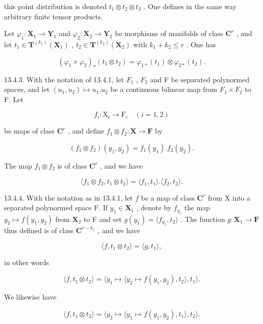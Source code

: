 this point distribution is denoted \(t_{1} \otimes t_{2} \otimes t_{3}\) . One defines in the same way arbitrary finite tensor products.

Let \(\varphi_{1}\colon\mathbf{X}_{1}\to\mathbf{Y}_{1}\) and \(\varphi_{2}\colon\mathbf{X}_{2}\to\mathbf{Y}_{2}\) be morphisms of manifolds of class \(\mathbf{C}^{r}\) , and let \(t_{1}\in\mathbf{T}^{(k_{1})}(\mathbf{X}_{1})\) , \(t_{2}\in\mathbf{T}^{(k_{2})}(\mathbf{X}_{2})\) with \(k_{1}+k_{2}\leqslant r\) . One has

\[
(\varphi_ {1} \times \varphi_ {2}) _ {*} (t _ {1} \otimes t _ {2}) = \varphi_ {1 *} (t _ {1}) \otimes \varphi_ {2 *} (t _ {2}).
\]

13.4.3. With the notation of 13.4.1, let \(F_{1}\) , \(F_{2}\) and F be separated polynormed spaces, and let \((u_{1}, u_{2}) \mapsto u_{1}.u_{2}\) be a continuous bilinear map from \(F_{1} \times F_{2}\) to F. Let

\[
f _ {i} \colon \mathrm{X} _ {i} \rightarrow \mathrm{F} _ {i} \quad (i = 1, 2)
\]

be maps of class \(\mathbf{C}^r\) , and define \(f_1 \otimes f_2: \mathbf{X} \to \mathbf{F}\) by

\[
(f _ {1} \otimes f _ {2}) (y _ {1}, y _ {2}) = f _ {1} (y _ {1}). f _ {2} (y _ {2}).
\]

The map \(f_{1} \otimes f_{2}\) is of class \(\mathbf{C}^{r}\) , and we have

\[
\langle f _ {1} \otimes f _ {2}, t _ {1} \otimes t _ {2} \rangle = \langle f _ {1}, t _ {1} \rangle . \langle f _ {2}, t _ {2} \rangle .
\]

13.4.4. With the notation as in 13.4.1, let \(f\) be a map of class \(\mathbf{C}^{r}\) from X into a separated polynormed space F. If \(y_{1} \in \mathbf{X}_{1}\) , denote by \(f_{y_{1}}\) the map \(y_{2} \mapsto f(y_{1}, y_{2})\) from \(\mathbf{X}_{2}\) to F and set \(g(y_{1}) = \langle f_{y_{1}}, t_{2} \rangle\) . The function \(g: \mathbf{X}_{1} \to \mathbf{F}\) thus defined is of class \(\mathbf{C}^{r - k_{1}}\) , and we have

\[
\langle f, t _ {1} \otimes t _ {2} \rangle = \langle g, t _ {1} \rangle ,
\]

in other words

\[
\langle f, t _ {1} \otimes t _ {2} \rangle = \langle y _ {1} \mapsto \langle y _ {2} \mapsto f (y _ {1}, y _ {2}), t _ {2} \rangle , t _ {1} \rangle .
\]

We likewise have

\[
\langle f, t _ {1} \otimes t _ {2} \rangle = \langle y _ {2} \mapsto \langle y _ {1} \mapsto f (y _ {1}, y _ {2}), t _ {1} \rangle , t _ {2} \rangle .
\]


